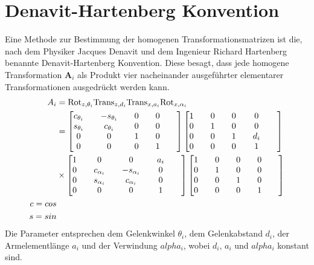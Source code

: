 \section{Denavit-Hartenberg Konvention}
Eine Methode zur Bestimmung der homogenen Transformationsmatrizen ist die, nach  dem Physiker Jacques Denavit und dem Ingenieur Richard Hartenberg benannte Denavit-Hartenberg Konvention. Diese besagt, dass jede homogene Transformation $\bm{A}_i$ als Produkt vier nacheinander ausgeführter elementarer Transformationen ausgedrückt werden kann. 
\begin{align}
	\label{eqn:elementarTransformation}
	A_i &= \text{Rot}_{z,\theta_i}\text{Trans}_{z,d_i}\text{Trans}_{x,a_i}\text{Rot}_{x,\alpha_i} \\
	&= \left[\begin{matrix}
		c_{\theta_i} &\quad -s_{\theta_i} &\quad 0 &\quad 0 \\
		s_{\theta_i} &\quad c_{\theta_i} &\quad 0 &\quad 0 \\
		0 &\quad 0 &\quad 1 &\quad 0 &\quad \\ 
		0 &\quad 0 &\quad 0 &\quad 1 &\quad 
	\end{matrix}\right] 
	\left[\begin{matrix}
		1 &\quad 0 &\quad 0 &\quad 0 \\
		0 &\quad 1 &\quad 0 &\quad 0 \\
		0 &\quad 0 &\quad 1 &\quad d_i &\quad \\ 
		0 &\quad 0 &\quad 0 &\quad 1 &\quad 
	\end{matrix}\right] \notag \\
	& \times
	\left[\begin{matrix}
		1 &\quad 0 &\quad 0 &\quad a_i \\
		0 &\quad c_{\alpha_i} &\quad -s_{\alpha_i} &\quad 0 \\
		0 &\quad s_{\alpha_i} &\quad c_{\alpha_i} &\quad 0 &\quad \\ 
		0 &\quad 0 &\quad 0 &\quad 1 &\quad 
	\end{matrix}\right]
	\left[\begin{matrix}
		1 &\quad 0 &\quad 0 &\quad 0 \\
		0 &\quad 1 &\quad 0 &\quad 0 \\
		0 &\quad 0 &\quad 1 &\quad 0 &\quad \\ 
		0 &\quad 0 &\quad 0 &\quad 1 &\quad 
	\end{matrix}\right]
	\notag \\
	c = cos\notag \\
	s = sin \notag 
\end{align}
Die Parameter entsprechen dem Gelenkwinkel $\theta_i$, dem Gelenkabstand $d_i$, der Armelementlänge $a_i$ und der Verwindung $alpha_i$, wobei $d_i$, $a_i$ und $alpha_i$ konstant sind.

